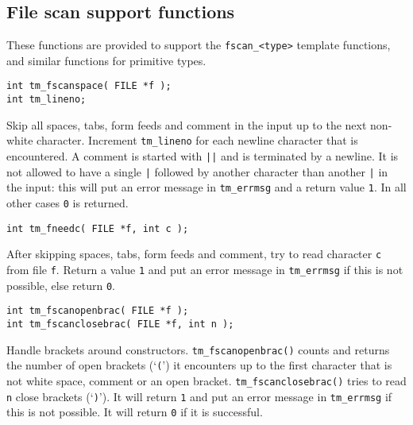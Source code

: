 \subsection{File scan support functions}
These functions are provided to support the \verb'fscan_<type>' template
functions, and similar functions for primitive types.
\par
\begin{verbatim}
int tm_fscanspace( FILE *f );
int tm_lineno;
\end{verbatim}
\begin{desc}
Skip all spaces, tabs, form feeds and comment in the input up to the
next non-white character.
Increment {\tt tm\_lineno} for each newline character that is encountered.
A comment is started with {\tt ||} and is terminated by a newline.
It is not allowed to have a single {\tt |}
followed by another character than another {\tt |} in the input:
this will put an error message in {\tt tm\_errmsg} and a return value {\tt 1}.
In all other cases {\tt 0} is returned.
\end{desc}
\begin{verbatim}
int tm_fneedc( FILE *f, int c );
\end{verbatim}
\begin{desc}
After skipping spaces, tabs, form feeds and comment,
try to read character {\tt c} from file {\tt f}.
Return a value {\tt 1} and put an error message in {\tt tm\_errmsg} if this
is not possible,
else return {\tt 0}.
\end{desc}
\begin{verbatim}
int tm_fscanopenbrac( FILE *f );
int tm_fscanclosebrac( FILE *f, int n );
\end{verbatim}
\begin{desc}
\begin{sloppypar}
Handle brackets around constructors.
\verb+tm_fscanopenbrac()+ counts and returns the number
of open brackets (`{\tt (}') it encounters up to the first character
that is not white space, comment or an open bracket.
\verb+tm_fscanclosebrac()+ tries to read {\tt n} close brackets (`{\tt )}').
It will return {\tt 1} and put an error message in {\tt tm\_errmsg} if this is
not possible.
It will return {\tt 0} if it is successful.
\end{sloppypar}
\end{desc}

